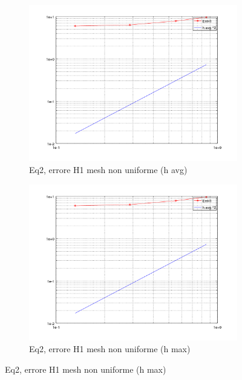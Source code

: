 \documentclass[12pt,a4paper]{report}
\theoremstyle{theorem}
\theoremstyle{theorem}
\theoremstyle{definition}
\begin{document}
\begin{figure}[!h]
	\centering
	\begin{subfigure}[b]{0.49\textwidth}
    		\includegraphics[width=\textwidth]{Eq2-H1avg.png}
		\caption{Eq2, errore H1 mesh non uniforme (h avg)}

    	\end{subfigure}
    	\begin{subfigure}[b]{0.49\textwidth}
    		\includegraphics[width=\textwidth]{Eq2-H1max.png}
    		\caption{Eq2, errore H1 mesh non uniforme (h max)}
    	\end{subfigure}
\end{figure}





\printindex

% 

%

\end{document}
